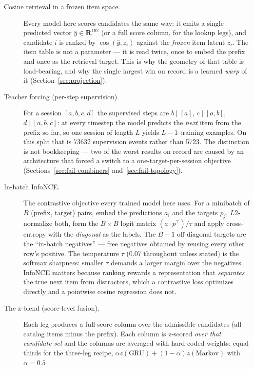 \documentclass[11pt]{article}
\begin{document}
\begin{description}
  \item[Cosine retrieval in a frozen item space.] Every model here scores
  candidates the same way: it emits a single predicted vector $\hat{y}\in
  \mathbf{R}^{192}$ (or a full score column, for the lookup legs), and candidate
  $i$ is ranked by $\cos(\hat{y}, z_i)$ against the \emph{frozen} item latent
  $z_i$. The item table is not a parameter --- it is read twice, once to embed
  the prefix and once as the retrieval target. This is why the geometry of that
  table is load-bearing, and why the single largest win on record is a learned
  \emph{warp} of it (Section~\ref{sec:projection}).
  \item[Teacher forcing (per-step supervision).] For a session $[a,b,c,d]$ the
  supervised steps are $b\mid[a]$, $c\mid[a,b]$, $d\mid[a,b,c]$: at every
  timestep the model predicts the \emph{next} item from the prefix so far, so one
  session of length $L$ yields $L-1$ training examples. On this split that is
  \num{73632} supervision events rather than \num{5723}. The distinction is not
  bookkeeping --- two of the worst results on record are caused by an
  architecture that forced a switch to a one-target-per-session objective
  (Sections~\ref{sec:fail-combiners} and~\ref{sec:fail-topology}).
  \item[In-batch InfoNCE.] The contrastive objective every trained model here
  uses. For a minibatch of $B$ (prefix, target) pairs, embed the predictions
  $a_i$ and the targets $p_j$, $L2$-normalize both, form the $B\times B$ logit
  matrix $(a\cdot p^{\top})/\tau$ and apply cross-entropy with the
  \emph{diagonal} as the labels. The $B-1$ off-diagonal targets are the
  ``in-batch negatives'' --- free negatives obtained by reusing every other row's
  positive. The temperature $\tau$ (\num{0.07} throughout unless stated) is the
  softmax sharpness: smaller $\tau$ demands a larger margin over the negatives.
  InfoNCE matters because ranking rewards a representation that \emph{separates}
  the true next item from distractors, which a contrastive loss optimizes
  directly and a pointwise cosine regression does not.
  \item[The z-blend (score-level fusion).] Each leg produces a full score column
  over the admissible candidates (all catalog items minus the prefix). Each
  column is z-scored \emph{over that candidate set} and the columns are averaged
  with hard-coded weights: equal thirds for the three-leg recipe,
  $\alpha z(\text{GRU}) + (1-\alpha)z(\text{Markov})$ with $\alpha=\num{0.5}$

\end{description}
\end{document}
